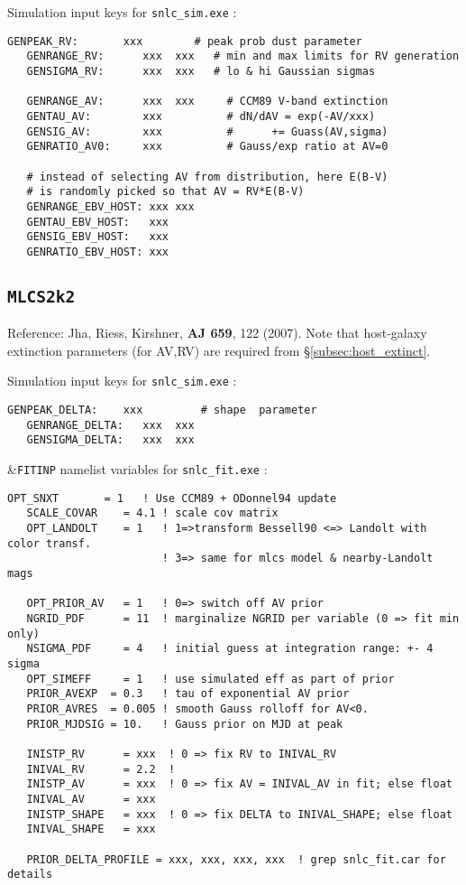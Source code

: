 \documentclass[12pt]{article}
\newcommand{\mlcs}{{\tt MLCS2k2}}
\begin{document}
\noindent
Simulation input keys  for  {\tt snlc\_sim.exe} :
\begin{Verbatim}[frame=single]
   GENPEAK_RV:       xxx        # peak prob dust parameter
   GENRANGE_RV:      xxx  xxx   # min and max limits for RV generation
   GENSIGMA_RV:      xxx  xxx   # lo & hi Gaussian sigmas

   GENRANGE_AV:      xxx  xxx     # CCM89 V-band extinction
   GENTAU_AV:        xxx          # dN/dAV = exp(-AV/xxx)
   GENSIG_AV:        xxx          #      += Guass(AV,sigma)
   GENRATIO_AV0:     xxx          # Gauss/exp ratio at AV=0

   # instead of selecting AV from distribution, here E(B-V)
   # is randomly picked so that AV = RV*E(B-V)
   GENRANGE_EBV_HOST: xxx xxx
   GENTAU_EBV_HOST:   xxx
   GENSIG_EBV_HOST:   xxx
   GENRATIO_EBV_HOST: xxx
\end{Verbatim}


\clearpage
\subsection{{\mlcs}}
\label{subsec:mlcs}

\noindent
Reference: Jha, Riess, Kirshner, {\bf AJ 659}, 122 (2007). 
Note that host-galaxy extinction parameters (for AV,RV) 
are required from \S\ref{subsec:host_extinct}.

\noindent
Simulation input keys  for  {\tt snlc\_sim.exe} :
\begin{Verbatim}[frame=single]
   GENPEAK_DELTA:    xxx         # shape  parameter
   GENRANGE_DELTA:   xxx  xxx
   GENSIGMA_DELTA:   xxx  xxx  
\end{Verbatim}

\bigskip
\noindent
\&{\tt FITINP} namelist variables for  {\tt snlc\_fit.exe} :
\begin{Verbatim}[frame=single]
   OPT_SNXT       = 1   ! Use CCM89 + ODonnel94 update
   SCALE_COVAR    = 4.1 ! scale cov matrix
   OPT_LANDOLT    = 1   ! 1=>transform Bessell90 <=> Landolt with color transf.
                        ! 3=> same for mlcs model & nearby-Landolt mags
 
   OPT_PRIOR_AV   = 1   ! 0=> switch off AV prior
   NGRID_PDF      = 11  ! marginalize NGRID per variable (0 => fit min only)
   NSIGMA_PDF     = 4   ! initial guess at integration range: +- 4 sigma
   OPT_SIMEFF     = 1   ! use simulated eff as part of prior 
   PRIOR_AVEXP  = 0.3   ! tau of exponential AV prior
   PRIOR_AVRES  = 0.005 ! smooth Gauss rolloff for AV<0.
   PRIOR_MJDSIG = 10.   ! Gauss prior on MJD at peak

   INISTP_RV      = xxx  ! 0 => fix RV to INIVAL_RV
   INIVAL_RV      = 2.2  ! 
   INISTP_AV      = xxx  ! 0 => fix AV = INIVAL_AV in fit; else float
   INIVAL_AV      = xxx 
   INISTP_SHAPE   = xxx  ! 0 => fix DELTA to INIVAL_SHAPE; else float
   INIVAL_SHAPE   = xxx

   PRIOR_DELTA_PROFILE = xxx, xxx, xxx, xxx  ! grep snlc_fit.car for details
\end{Verbatim}
\end{document}
